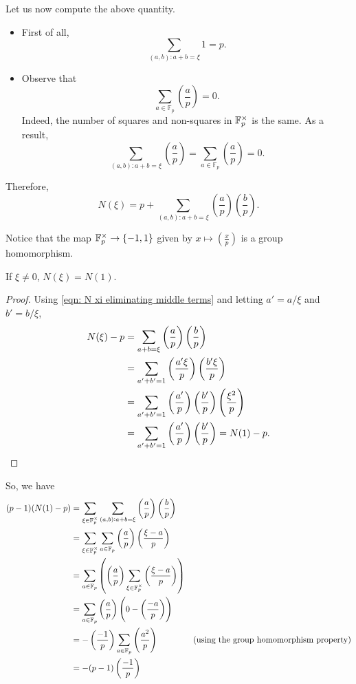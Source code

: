 			Let us now compute the above quantity.
			\begin{itemize}
				\item First of all,
				\[ \sum_{(a,b): a + b = \xi} 1 = p. \]

				\item Observe that
				\[ \sum_{a \in \mathbb{F}_p} \left(\frac{a}{p}\right) = 0. \]
				Indeed, the number of squares and non-squares in $\mathbb{F}_p^\times$ is the same. As a result,
				\[ \sum_{(a,b): a + b = \xi} \left(\frac{a}{p}\right) = \sum_{a\in\mathbb{F}_p} \left(\frac{a}{p}\right) = 0. \]
			\end{itemize}

			Therefore,
			\begin{equation}
				\label{eqn: N xi eliminating middle terms}
				N(\xi) = p + \sum_{(a,b) : a + b = \xi} \left(\frac{a}{p}\right) \left(\frac{b}{p}\right).
			\end{equation}

			Notice that the map $\mathbb{F}_p^\times \to \{-1,1\}$ given by $x \mapsto \left(\frac{x}{p}\right)$ is a group homomorphism.
			\clearpage

			\begin{lemma}
				If $\xi\ne 0$, $N(\xi) = N(1)$.
			\end{lemma}

			\begin{proof}
				Using \eqref{eqn: N xi eliminating middle terms} and letting $a' = a/\xi$ and $b'=b/\xi$,
				\begin{align*}
					N(\xi) - p &= \sum_{a+b=\xi} \left(\frac{a}{p}\right) \left(\frac{b}{p}\right) \\
					&= \sum_{a'+b'=1} \left(\frac{a'\xi}{p}\right) \left(\frac{b'\xi}{p}\right) \\
					&= \sum_{a'+b'=1} \left(\frac{a'}{p}\right) \left(\frac{b'}{p}\right) \left(\frac{\xi^2}{p}\right) \\
					&= \sum_{a'+b'=1} \left(\frac{a'}{p}\right) \left(\frac{b'}{p}\right) = N(1) - p. \qedhere
				\end{align*}
			\end{proof}

			So, we have
			\begin{align*}
				(p-1)(N(1) - p) &= \sum_{\xi\in\mathbb{F}_p^\times} \sum_{(a,b) : a+b=\xi} \left(\frac{a}{p}\right)\left(\frac{b}{p}\right) \\
				&= \sum_{\xi\in\mathbb{F}_p^\times} \sum_{a\in\mathbb{F}_p} \left(\frac{a}{p}\right) \left(\frac{\xi-a}{p}\right) \\
				&= \sum_{a\in\mathbb{F}_p} \left( \left(\frac{a}{p}\right) \sum_{\xi\in\mathbb{F}_p^\times} \left(\frac{\xi-a}{p}\right) \right) \\
				&= \sum_{a\in\mathbb{F}_p} \left(\frac{a}{p}\right) \left(0 - \left(\frac{-a}{p}\right)\right) \\
				&= -\left(\frac{-1}{p}\right) \sum_{a\in\mathbb{F}_p} \left(\frac{a^2}{p}\right) & \text{(using the group homomorphism property)} \\
				&= -(p-1)\left(\frac{-1}{p}\right)
			\end{align*}

